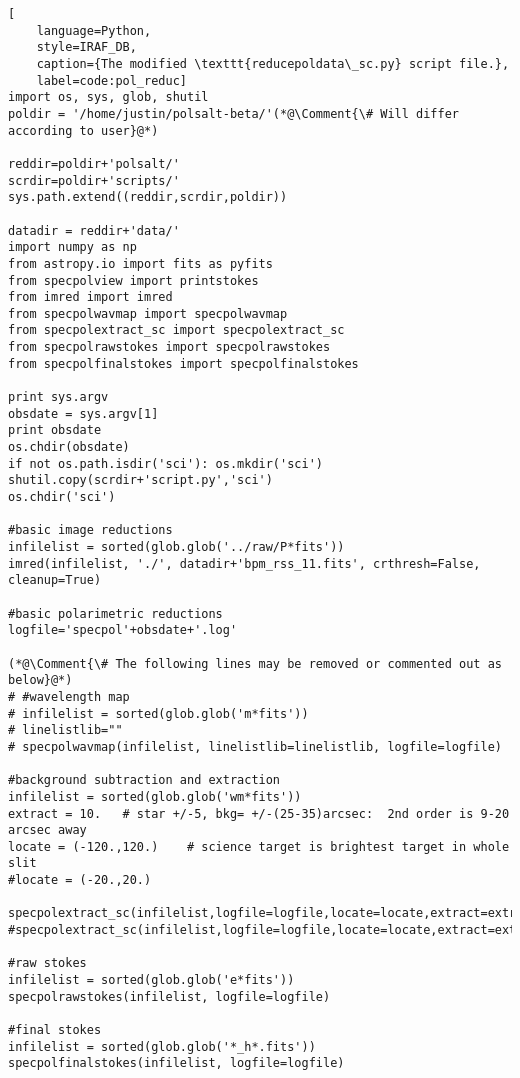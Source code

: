 \newcommand*{\Comment}[1]{\hfill\makebox[7.0cm][l]{#1}}%
\begin{lstlisting}[
    language=Python,
    style=IRAF_DB,
    caption={The modified \texttt{reducepoldata\_sc.py} script file.},
    label=code:pol_reduc]
import os, sys, glob, shutil
poldir = '/home/justin/polsalt-beta/'(*@\Comment{\# Will differ according to user}@*)

reddir=poldir+'polsalt/'
scrdir=poldir+'scripts/'
sys.path.extend((reddir,scrdir,poldir))

datadir = reddir+'data/'
import numpy as np
from astropy.io import fits as pyfits
from specpolview import printstokes
from imred import imred
from specpolwavmap import specpolwavmap
from specpolextract_sc import specpolextract_sc
from specpolrawstokes import specpolrawstokes
from specpolfinalstokes import specpolfinalstokes

print sys.argv
obsdate = sys.argv[1]
print obsdate
os.chdir(obsdate)
if not os.path.isdir('sci'): os.mkdir('sci')
shutil.copy(scrdir+'script.py','sci')
os.chdir('sci')

#basic image reductions
infilelist = sorted(glob.glob('../raw/P*fits'))
imred(infilelist, './', datadir+'bpm_rss_11.fits', crthresh=False, cleanup=True)

#basic polarimetric reductions
logfile='specpol'+obsdate+'.log'

(*@\Comment{\# The following lines may be removed or commented out as below}@*)
# #wavelength map
# infilelist = sorted(glob.glob('m*fits'))
# linelistlib=""
# specpolwavmap(infilelist, linelistlib=linelistlib, logfile=logfile)

#background subtraction and extraction
infilelist = sorted(glob.glob('wm*fits'))
extract = 10.   # star +/-5, bkg= +/-(25-35)arcsec:  2nd order is 9-20 arcsec away
locate = (-120.,120.)    # science target is brightest target in whole slit
#locate = (-20.,20.)

specpolextract_sc(infilelist,logfile=logfile,locate=locate,extract=extract)
#specpolextract_sc(infilelist,logfile=logfile,locate=locate,extract=extract,docomp=True,useoldc=True)

#raw stokes
infilelist = sorted(glob.glob('e*fits'))
specpolrawstokes(infilelist, logfile=logfile)

#final stokes
infilelist = sorted(glob.glob('*_h*.fits'))
specpolfinalstokes(infilelist, logfile=logfile)

\end{lstlisting}

